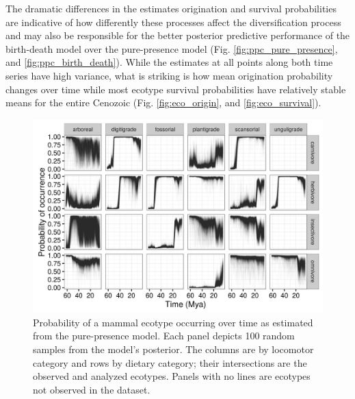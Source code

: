 \documentclass[12pt,letterpaper]{article}
\begin{document}
The dramatic differences in the estimates origination and survival probabilities are indicative of how differently these processes affect the diversification process and may also be responsible for the better posterior predictive performance of the birth-death model over the pure-presence model (Fig. \ref{fig:ppc_pure_presence}, and \ref{fig:ppc_birth_death}). While the estimates at all points along both time series have high variance, what is striking is how mean origination probability changes over time while most ecotype survival probabilities have relatively stable means for the entire Cenozoic (Fig. \ref{fig:eco_origin}, and \ref{fig:eco_survival}).



\begin{figure}[ht]
  \centering
  \includegraphics[width=\textwidth,height=0.4\textheight,keepaspectratio=true]{figure/ecotype_occurrence}
  \caption[Ecotype occurrence probability estimated from the pure-presence model]{Probability of a mammal ecotype occurring over time as estimated from the pure-presence model. Each panel depicts 100 random samples from the model's posterior. The columns are by locomotor category and rows by dietary category; their intersections are the observed and analyzed ecotypes. Panels with no lines are ecotypes not observed in the dataset.}
  \label{fig:eco_occur}
\end{figure}
\end{document}
